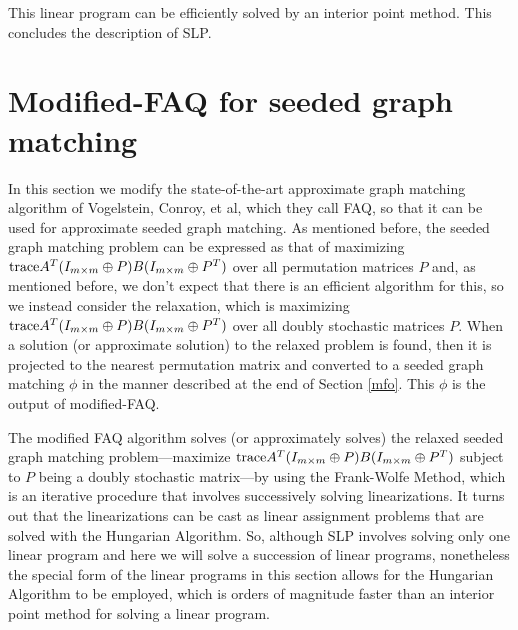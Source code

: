 \documentclass[12pt]{article}
\newcommand{\tr}{\textup{trace}}
\begin{document}
This linear program can be efficiently solved by an interior point method. This
concludes the description of SLP.



\section{Modified-FAQ for seeded graph matching \label{mfaq}}

In this section we modify the state-of-the-art approximate graph matching
algorithm of Vogelstein, Conroy, et al, which they call FAQ, so that it can
be used for approximate seeded graph matching. As mentioned before, the
seeded graph matching problem
can be expressed as that of maximizing
$\tr A^T(I_{m \times m}\oplus P)B(I_{m \times m}\oplus P^T)$
over all permutation matrices $P$ and, as mentioned before,
we don't expect that there is an efficient algorithm for this,
so we instead consider the relaxation,
which is maximizing $\tr A^T(I_{m \times m}\oplus P)B(I_{m \times m}\oplus P^T)$
over all doubly stochastic matrices $P$.
When a solution (or approximate solution) to the relaxed problem is found,
then it is projected to the nearest permutation matrix and converted 
to a seeded graph matching $\phi$
in the manner described at the end of Section \ref{mfo}.
 This $\phi$ is the output of modified-FAQ.


The modified FAQ algorithm solves (or approximately
solves) the relaxed seeded graph matching problem---maximize
$\tr A^T(I_{m \times m}\oplus P)B(I_{m \times m}\oplus P^T)$
subject to $P$ being a doubly stochastic matrix---by using the
Frank-Wolfe Method, which is an iterative procedure that
involves successively solving linearizations. It turns out that the
linearizations can be cast as linear assignment problems
that are solved with the Hungarian Algorithm. So, although SLP
involves solving only one linear program and here we will solve
a succession of linear programs, nonetheless the special form of
the linear programs in this section allows for the Hungarian Algorithm
to be employed, which is orders of magnitude faster than  an
interior point method for solving a linear program.
\end{document}

